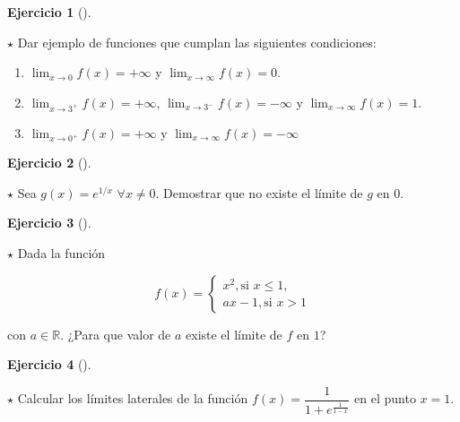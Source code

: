 \documentclass[
  a4paper,
]{scrreport}
\theoremstyle{definition}
\newtheorem{exercise}{Ejercicio}[chapter]
\theoremstyle{remark}
\begin{document}
\leavevmode{}%
\begin{exercise}[]\label{exr-ejemplos-limites-laterales}

\(\star\) Dar ejemplo de funciones que cumplan las siguientes
condiciones:

\begin{enumerate}
\def\labelenumi{\alph{enumi}.}
\item
  \(\lim_{x\to 0}f(x)=+\infty\) y \(\lim_{x\to \infty}f(x)=0\).
\item
  \(\lim_{x\to 3^+}f(x)=+\infty\), \(\lim_{x\to 3^-}f(x)=-\infty\) y
  \(\lim_{x\to \infty}f(x)=1\).
\item
  \(\lim_{x\to 0^+}f(x)=+\infty\) y \(\lim_{x\to \infty}f(x)=-\infty\)
\end{enumerate}

\end{exercise}

\leavevmode{}%
\begin{exercise}[]\label{exr-limite-laterales}

\(\star\) Sea \(g(x)=e^{1/x}\) \(\forall x\neq 0\). Demostrar que no
existe el límite de \(g\) en \(0\).

\end{exercise}

\leavevmode{}%
\begin{exercise}[]\label{exr-limites-laterales}

\(\star\) Dada la función

\[
f(x)=\begin{cases}
x^2, \mbox{si } x\leq 1,\\ 
ax-1, \mbox{si } x>1
\end{cases}
\]

con \(a\in\mathbb{R}\). ¿Para que valor de \(a\) existe el límite de
\(f\) en \(1\)?

\end{exercise}

\leavevmode{}%
\begin{exercise}[]\label{exr-limites-laterales-2}

\(\star\) Calcular los límites laterales de la función
\(f(x)=\dfrac{1}{1+e^{\frac{1}{1-x}}}\) en el punto \(x=1\).

\end{exercise}
\end{document}
